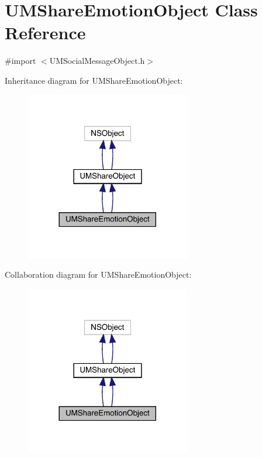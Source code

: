 \hypertarget{interface_u_m_share_emotion_object}{}\section{U\+M\+Share\+Emotion\+Object Class Reference}
\label{interface_u_m_share_emotion_object}


{\ttfamily \#import $<$U\+M\+Social\+Message\+Object.\+h$>$}



Inheritance diagram for U\+M\+Share\+Emotion\+Object\+:\nopagebreak
\begin{figure}[H]
\begin{center}
\leavevmode
\includegraphics[width=204pt]{interface_u_m_share_emotion_object__inherit__graph}
\end{center}
\end{figure}


Collaboration diagram for U\+M\+Share\+Emotion\+Object\+:\nopagebreak
\begin{figure}[H]
\begin{center}
\leavevmode
\includegraphics[width=204pt]{interface_u_m_share_emotion_object__coll__graph}
\end{center}
\end{figure}
